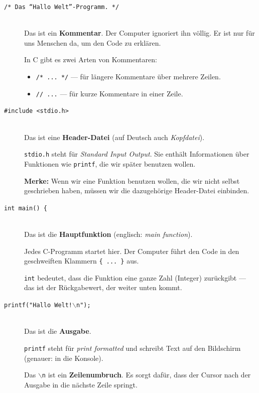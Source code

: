 \begin{description}
    \item[\texttt{/* Das ``Hallo Welt''-Programm. */}]\hfill\\
        Das ist ein \textbf{Kommentar}.
        Der Computer ignoriert ihn völlig. Er ist nur für uns Menschen da,
        um den Code zu erklären.

        In C gibt es zwei Arten von Kommentaren:
        \begin{itemize}
            \item \texttt{/* ... */} — für längere Kommentare über mehrere Zeilen.
            \item \texttt{// ...} — für kurze Kommentare in einer Zeile.
        \end{itemize}

    \item[\texttt{\#include <stdio.h>}]\hfill\\
        Das ist eine \textbf{Header-Datei} (auf Deutsch auch \emph{Kopfdatei}).

        \texttt{stdio.h} steht für \textit{Standard Input Output}.
        Sie enthält Informationen über Funktionen wie \texttt{printf},
        die wir später benutzen wollen.

        \textbf{Merke:} Wenn wir eine Funktion benutzen wollen, die wir nicht
        selbst geschrieben haben, müssen wir die dazugehörige Header-Datei
        einbinden.

    \item[\texttt{int main() \{ }]\hfill\\
        Das ist die \textbf{Hauptfunktion} (englisch: \textit{main function}).

        Jedes C-Programm startet hier. Der Computer führt den Code in den
        geschweiften Klammern \texttt{\{ ... \}} aus.

        \texttt{int} bedeutet, dass die Funktion eine ganze Zahl (Integer)
        zurückgibt — das ist der Rückgabewert, der weiter unten kommt.

    \item[\texttt{printf("Hallo Welt!$\backslash$n");}]\hfill\\
        Das ist die \textbf{Ausgabe}.

        \texttt{printf} steht für \textit{print formatted} und schreibt Text
        auf den Bildschirm (genauer: in die Konsole).

        Das \texttt{$\backslash$n} ist ein \textbf{Zeilenumbruch}.
        Es sorgt dafür, dass der Cursor nach der Ausgabe in die nächste Zeile springt.


\end{description}
